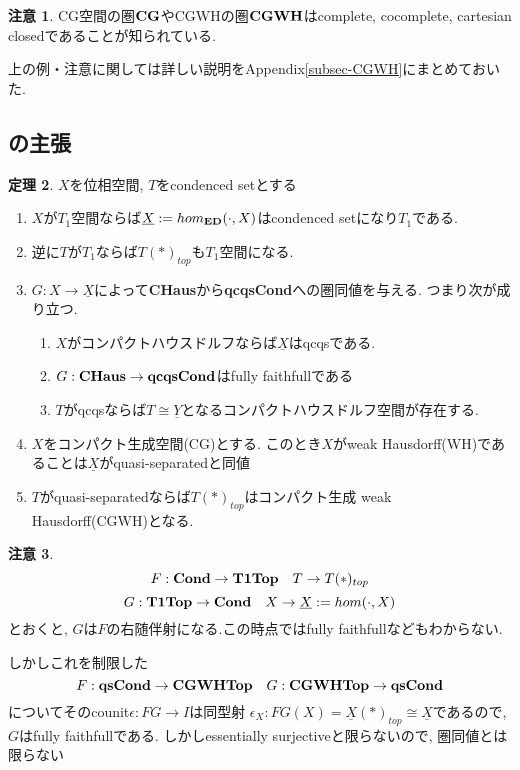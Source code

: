 \documentclass[dvipdfmx,a4paper,11pt]{article}
\theoremstyle{definition}
\newtheorem{thm}{定理}
\newtheorem{rem}[thm]{注意}
\begin{document}
\begin{rem}
CG空間の圏${\bf CG}$やCGWHの圏${\bf CGWH}$はcomplete, cocomplete, cartesian closedであることが知られている. 
\end{rem}

上の例・注意に関しては詳しい説明をAppendix\ref{subsec-CGWH}にまとめておいた. 

\subsection{\cite[Proposition 2.15, Theorem 2.16]{Sch19}の主張}

 \begin{tcolorbox}
 [colback = white, colframe = green!35!black, fonttitle = \bfseries,breakable = true]
\begin{thm}\cite[Proposition 2.15, Theorem 2.16]{Sch19}
\label{thm-Scholze-21516}
$X$を位相空間, $T$をcondenced setとする
\begin{enumerate}
\item $X$が$T_1$空間ならば$\underline{X}:=hom_{{\bf ED}}(\cdot, X)$はcondenced setになり$T_1$である. 
\item 逆に$T$が$T_1$ならば$T(\ast)_{top}$も$T_1$空間になる. 
\item $G : X \to \underline{X}$によって{\bf CHaus}から{\bf qcqsCond}への圏同値を与える. 
つまり次が成り立つ.
\begin{enumerate}
\item $X$がコンパクトハウスドルフならば$\underline{X}$はqcqsである.
\item $G : {\bf CHaus} \to {\bf qcqsCond}$はfully faithfullである
\item $T$がqcqsならば$T \cong \underline{Y}$となるコンパクトハウスドルフ空間が存在する. 
\end{enumerate}
\item $X$をコンパクト生成空間(CG)とする. このとき$X$がweak Hausdorff(WH)であることは$\underline{X}$がquasi-separatedと同値
\item $T$がquasi-separatedならば$T(\ast)_{top}$はコンパクト生成 weak Hausdorff(CGWH)となる.
\end{enumerate}
\end{thm}
 \end{tcolorbox}
 
 \begin{rem}
 $$F: 
 {\bf Cond }\to 
 {\bf T1Top}
 \quad 
 T \to T(\ast)_{top}$$
$$G :  {\bf T1Top} \to {\bf Cond} \quad X \to \underline{X}:=hom(\cdot, X)$$
とおくと, $G$は$F$の右随伴射になる.この時点ではfully faithfullなどもわからない.

しかしこれを制限した
$$
F: {\bf qsCond}
\to {\bf CGWHTop} 
\quad G :  
{\bf CGWHTop} \to{\bf qsCond}
$$
についてそのcounit$\epsilon : FG \to I$は同型射
$\epsilon_{X} : FG(X) = \underline{X}(\ast)_{top} \cong \underline{X}$であるので, $G$はfully faithfullである. しかしessentially surjectiveと限らないので, 圏同値とは限らない
 \end{rem}
\end{document}
